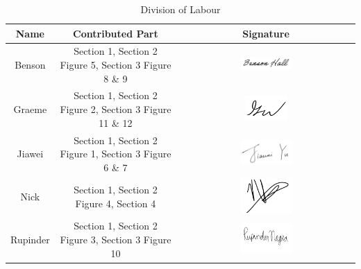 \documentclass[]{article}
\begin{document}
\begin{table}[h]
    \centering
    \begin{tabular}{|c|c|c|}
    \hline
        \textbf{Name} & \textbf{Contributed Part} & \textbf{Signature} \\
        \hline
        Benson & Section 1, Section 2 Figure 5, Section 3 Figure 8 \& 9
        & \includegraphics[width=0.3\textwidth]{signatures/bensonsignature.JPG}\\
        \hline
        Graeme &  Section 1, Section 2 Figure 2, Section 3 Figure 11 \& 12
        & \includegraphics[width=0.25\textwidth]{signatures/graeme_signature.png} \\
        \hline
        Jiawei & Section 1, Section 2 Figure 1, Section 3 Figure 6 \& 7
        & \includegraphics[width=0.3\textwidth]{signatures/Signature_Jiawei.PNG}\\
        \hline
        Nick & Section 1, Section 2 Figure 4, Section 4
        & \includegraphics[width=0.3\textwidth]{signatures/nick signature.PNG} \\
        \hline
        Rupinder & Section 1, Section 2 Figure 3, Section 3 Figure 10
        & \includegraphics[width=0.3\textwidth]{signatures/Rupinder Signature.png}\\
        \hline
    \end{tabular}
    \caption{Division of Labour}
    \label{tab:my_label}
\end{table}
\end{document}
